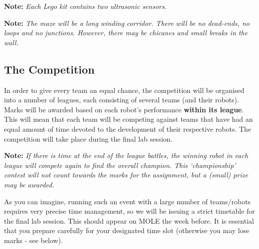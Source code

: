 \documentclass[hidelinks,a4paper,11pt]{article}
\begin{document}
{\bfseries Note:}  \emph{Each Lego kit contains two ultrasonic sensors.}

{\bfseries Note:}  \emph{The maze will be a long winding corridor.  There will be no dead-ends, no loops and no junctions.  However, there may be chicanes and small breaks in the wall.}


\subsection{The Competition}

In order to give every team an equal chance, the competition will be organised into a number of leagues, each consisting of several teams (and their robots).  Marks will be awarded based on each robot's performance \textbf{within its league}.  This will mean that each team will be competing against teams that have had an equal amount of time devoted to the development of their respective robots.  The competition will take place during the final lab session.

{\bfseries Note:}  \emph{If there is time at the end of the league battles, the winning robot in each league will compete again to find the overall champion.  This `championship' contest will not count towards the marks for the assignment, but a (small) prize may be awarded.}

As you can imagine, running such an event with a large number of teams/robots requires very precise time management, so we will be issuing a strict timetable for the final lab session.  This should appear on MOLE the week before.  It is essential that you prepare carefully for your designated time slot (otherwise you may lose marks - see below).
\end{document}
